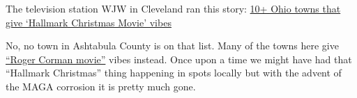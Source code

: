 The television station WJW in Cleveland ran this story:
\href{https://fox8.com/news/10-ohio-towns-that-give-hallmark-christmas-movie-vibes/}{10+
Ohio towns that give `Hallmark Christmas Movie' vibes}

No, no town in Ashtabula County is on that list. Many of the towns here
give
\href{https://en.wikipedia.org/w/index.php?title=Roger_Corman_filmography&oldid=1183488896}{``Roger
Corman movie''} vibes instead. Once upon a time we might have had that
``Hallmark Christmas'' thing happening in spots locally but with the
advent of the MAGA corrosion it is pretty much gone.
